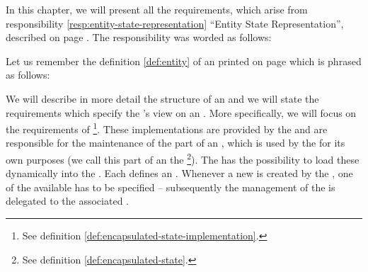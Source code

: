 \documentclass[a4paper, 12pt]{book}
\begin{document}
In this chapter, we will present all the requirements, which arise from 
responsibility \ref{resp:entity-state-representation} ``Entity State
Representation'', described on page
\pageref{resp:entity-state-representation}. The responsibility was worded as
follows:
\begin{quote}
  \respentitystaterepresentation
\end{quote}
Let us remember the definition \ref{def:entity}
of an  printed on page \pageref{def:entity} which is phrased as follows:
\begin{quote}
\end{quote}
We will describe in more detail the structure of an
 and we will state the requirements which specify the
\SYNEIGHT's view on an . 
%
More specifically, we will focus on the requirements of \footnote{See definition \vref{def:encapsulated-state-implementation}.}. 
%
These implementations are provided by the  and are responsible for
the maintenance of the part of an , which is used by the
 for its own purposes (we call this part of an 
the \footnote{See definition
  \vref{def:encapsulated-state}.}). 
%
The  has the possibility to load these  dynamically into the \SYNEIGHT. Each  defines an . Whenever a new  is
created by the , one of the available  has to be
specified -- subsequently the management of the  is
delegated to the associated .
%


\end{document}
